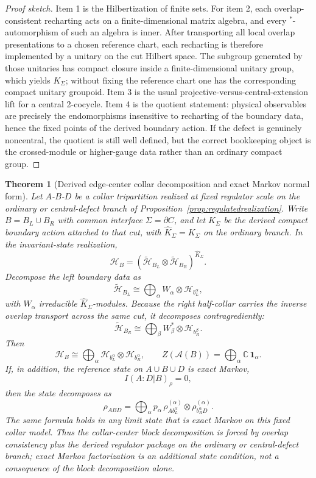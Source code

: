 \documentclass[11pt]{article}
\newtheorem{theorem}{Theorem}[section]
\begin{document}
\begin{proof}[Proof sketch]
Item 1 is the Hilbertization of finite sets. For item 2, each overlap-consistent recharting acts on a finite-dimensional matrix algebra, and every \(^*\)-automorphism of such an algebra is inner. After transporting all local overlap presentations to a chosen reference chart, each recharting is therefore implemented by a unitary on the cut Hilbert space. The subgroup generated by those unitaries has compact closure inside a finite-dimensional unitary group, which yields \(K_\Sigma\); without fixing the reference chart one has the corresponding compact unitary groupoid. Item 3 is the usual projective-versus-central-extension lift for a central 2-cocycle. Item 4 is the quotient statement: physical observables are precisely the endomorphisms insensitive to recharting of the boundary data, hence the fixed points of the derived boundary action. If the defect is genuinely noncentral, the quotient is still well defined, but the correct bookkeeping object is the crossed-module or higher-gauge data rather than an ordinary compact group.
\end{proof}

\begin{theorem}[Derived edge-center collar decomposition and exact Markov normal form]\label{thm:markovcollar}
Let \(A\)-\(B\)-\(D\) be a collar tripartition realized at fixed regulator scale on the ordinary or central-defect branch of Proposition~\ref{prop:regulatedrealization}. Write \(B=B_L\cup B_R\) with common interface \(\Sigma=\partial C\), and let \(\widehat K_\Sigma\) be the derived compact boundary action attached to that cut, with \(\widehat K_\Sigma=K_\Sigma\) on the ordinary branch. In the invariant-state realization,
\[
\mathcal H_B=(\tilde{\mathcal H}_{B_L}\otimes \tilde{\mathcal H}_{B_R})^{\widehat K_\Sigma}.
\]
Decompose the left boundary data as
\[
\tilde{\mathcal H}_{B_L}\cong \bigoplus_\alpha W_\alpha\otimes \mathcal H_{b_L^\alpha},
\]
with \(W_\alpha\) irreducible \(\widehat K_\Sigma\)-modules. Because the right half-collar carries the inverse overlap transport across the same cut, it decomposes contragrediently:
\[
\tilde{\mathcal H}_{B_R}\cong \bigoplus_\beta W_\beta^*\otimes \mathcal H_{b_R^\beta}.
\]
Then
\[
\mathcal H_B\cong\bigoplus_\alpha \mathcal H_{b_L^\alpha}\otimes \mathcal H_{b_R^\alpha},
\qquad
Z(\mathcal A(B))=\bigoplus_\alpha \mathbb C\,\mathbf 1_\alpha.
\]
If, in addition, the reference state on \(A\cup B\cup D\) is exact Markov,
\[
I(A:D|B)_\rho=0,
\]
then the state decomposes as
\[
\rho_{ABD}
=
\bigoplus_\alpha p_\alpha\,
\rho^{(\alpha)}_{A b_L^\alpha}\otimes \rho^{(\alpha)}_{b_R^\alpha D}.
\]
The same formula holds in any limit state that is exact Markov on this fixed collar model.
Thus the collar-center block decomposition is forced by overlap consistency plus the derived regulator package on the ordinary or central-defect branch; exact Markov factorization is an additional state condition, not a consequence of the block decomposition alone.
\end{theorem}
\end{document}
